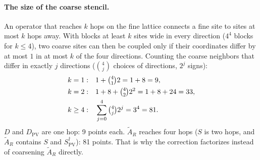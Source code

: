\documentclass[11pt,a4paper]{article}
\numberwithin{equation}{section}
\newcommand{\dg}{^{\dagger}}
\newcommand{\Dpv}{D_{\mathrm{PV}}}
\newcommand{\Spv}{S_{\mathrm{PV}}}
\newcommand{\AR}{\tilde A_{R}}
\begin{document}
\paragraph{The size of the coarse stencil.} An operator that reaches $k$ hops on the fine lattice
connects a fine site to sites at most $k$ hops away. With blocks at least $k$ sites wide in every
direction ($4^4$ blocks for $k\le4$), two coarse sites can then be coupled only if their coordinates
differ by at most $1$ in at most $k$ of the four directions. Counting the coarse neighbors that differ in exactly $j$ directions ($\binom4j$ choices
of directions, $2^j$ signs):
\begin{align}
k=1:&\quad 1+\tbinom41 2=1+8=9,\nonumber\\
k=2:&\quad 1+8+\tbinom42 2^2=1+8+24=33,\nonumber\\
k\ge4:&\quad \sum_{j=0}^{4}\tbinom4j2^j=3^4=81 .
\end{align}
$D$ and $\Dpv$ are one hop: 9 points each. $\AR$ reaches four hops ($S$ is two hops, and $\AR$
contains $S$ and $\Spv\dg$): 81 points. That is why the correction factorizes instead of
coarsening $\AR$ directly.
\end{document}
